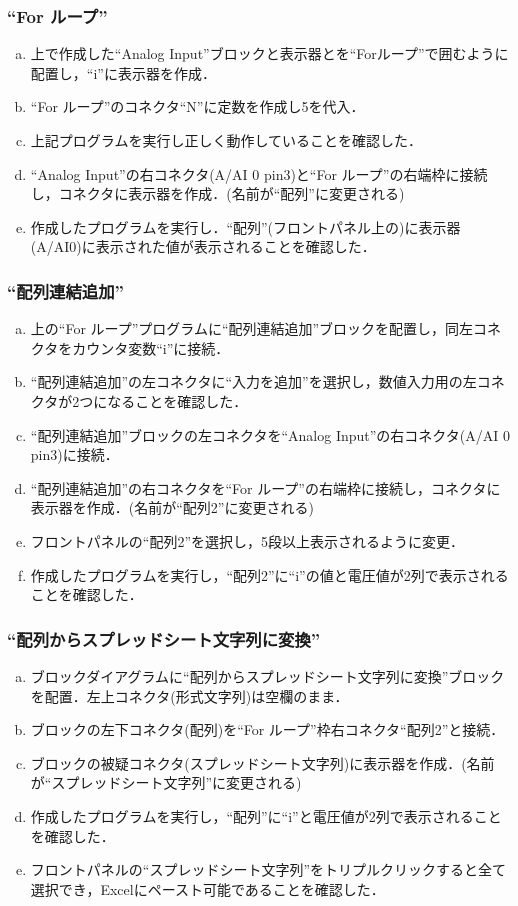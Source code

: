 \subsubsection{``For ループ''}
\begin{enumerate}[a)]
	\item 上で作成した``Analog Input''ブロックと表示器とを``Forループ''で囲むように配置し，``i''に表示器を作成．
	\item ``For ループ''のコネクタ``N''に定数を作成し5を代入．
	\item 上記プログラムを実行し正しく動作していることを確認した．
	\item ``Analog Input''の右コネクタ(A/AI 0 pin3)と``For ループ''の右端枠に接続し，コネクタに表示器を作成．(名前が``配列''に変更される)
	\item 作成したプログラムを実行し．``配列''(フロントパネル上の)に表示器(A/AI0)に表示された値が表示されることを確認した．
\end{enumerate}

\subsubsection{``配列連結追加''}
\begin{enumerate}[a)]
	\item 上の``For ループ''プログラムに``配列連結追加''ブロックを配置し，同左コネクタをカウンタ変数``i''に接続．
	\item ``配列連結追加''の左コネクタに``入力を追加''を選択し，数値入力用の左コネクタが2つになることを確認した．
	\item ``配列連結追加''ブロックの左コネクタを``Analog Input''の右コネクタ(A/AI 0 pin3)に接続．
	\item ``配列連結追加''の右コネクタを``For ループ''の右端枠に接続し，コネクタに表示器を作成．(名前が``配列2''に変更される)
	\item フロントパネルの“配列2”を選択し，5段以上表示されるように変更．
	\item 作成したプログラムを実行し，``配列2''に``i''の値と電圧値が2列で表示されることを確認した．
\end{enumerate}

\subsubsection{``配列からスプレッドシート文字列に変換''}
\begin{enumerate}[a)]
	\item ブロックダイアグラムに``配列からスプレッドシート文字列に変換''ブロックを配置．左上コネクタ(形式文字列)は空欄のまま．
	\item ブロックの左下コネクタ(配列)を``For ループ''枠右コネクタ``配列2''と接続．
	\item ブロックの被疑コネクタ(スプレッドシート文字列)に表示器を作成．(名前が``スプレッドシート文字列''に変更される)
	\item 作成したプログラムを実行し，``配列''に``i''と電圧値が2列で表示されることを確認した．
	\item フロントパネルの``スプレッドシート文字列''をトリプルクリックすると全て選択でき，Excelにペースト可能であることを確認した．
\end{enumerate}

